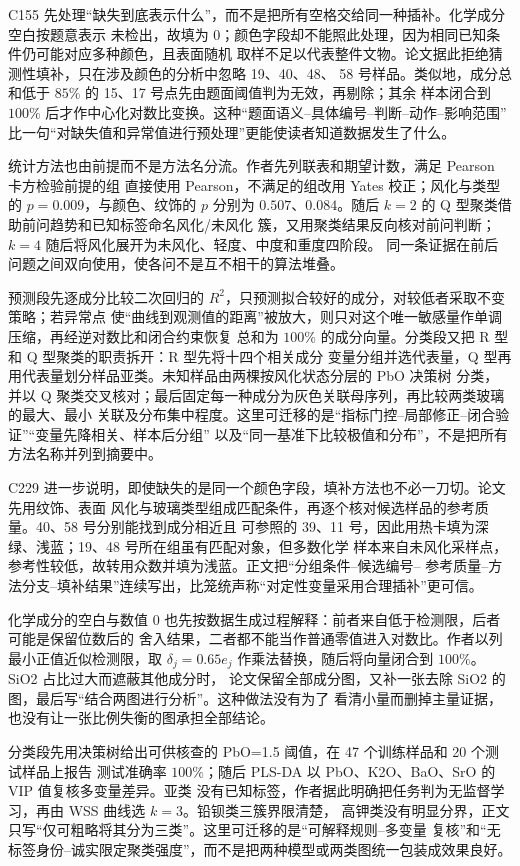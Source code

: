 C155 先处理“缺失到底表示什么”，而不是把所有空格交给同一种插补。化学成分空白按题意表示
未检出，故填为 0；颜色字段却不能照此处理，因为相同已知条件仍可能对应多种颜色，且表面随机
取样不足以代表整件文物。论文据此拒绝猜测性填补，只在涉及颜色的分析中忽略 19、40、48、
58 号样品。类似地，成分总和低于 $85\%$ 的 15、17 号点先由题面阈值判为无效，再剔除；其余
样本闭合到 $100\%$ 后才作中心化对数比变换。这种“题面语义--具体编号--判断--动作--影响范围”
比一句“对缺失值和异常值进行预处理”更能使读者知道数据发生了什么。

统计方法也由前提而不是方法名分流。作者先列联表和期望计数，满足 Pearson 卡方检验前提的组
直接使用 Pearson，不满足的组改用 Yates 校正；风化与类型的 $p=0.009$，与颜色、纹饰的
$p$ 分别为 $0.507$、$0.084$。随后 $k=2$ 的 Q 型聚类借助前问趋势和已知标签命名风化/未风化
簇，又用聚类结果反向核对前问判断；$k=4$ 随后将风化展开为未风化、轻度、中度和重度四阶段。
同一条证据在前后问题之间双向使用，使各问不是互不相干的算法堆叠。

预测段先逐成分比较二次回归的 $R^2$，只预测拟合较好的成分，对较低者采取不变策略；若异常点
使“曲线到观测值的距离”被放大，则只对这个唯一敏感量作单调压缩，再经逆对数比和闭合约束恢复
总和为 $100\%$ 的成分向量。分类段又把 R 型和 Q 型聚类的职责拆开：R 型先将十四个相关成分
变量分组并选代表量，Q 型再用代表量划分样品亚类。未知样品由两棵按风化状态分层的 PbO 决策树
分类，并以 Q 聚类交叉核对；最后固定每一种成分为灰色关联母序列，再比较两类玻璃的最大、最小
关联及分布集中程度。这里可迁移的是“指标门控--局部修正--闭合验证”“变量先降相关、样本后分组”
以及“同一基准下比较极值和分布”，不是把所有方法名称并列到摘要中。

C229 进一步说明，即使缺失的是同一个颜色字段，填补方法也不必一刀切。论文先用纹饰、表面
风化与玻璃类型组成匹配条件，再逐个核对候选样品的参考质量。40、58 号分别能找到成分相近且
可参照的 39、11 号，因此用热卡填为深绿、浅蓝；19、48 号所在组虽有匹配对象，但多数化学
样本来自未风化采样点，参考性较低，故转用众数并填为浅蓝。正文把“分组条件--候选编号--
参考质量--方法分支--填补结果”连续写出，比笼统声称“对定性变量采用合理插补”更可信。

化学成分的空白与数值 0 也先按数据生成过程解释：前者来自低于检测限，后者可能是保留位数后的
舍入结果，二者都不能当作普通零值进入对数比。作者以列最小正值近似检测限，取
$\delta_j=0.65e_j$ 作乘法替换，随后将向量闭合到 $100\%$。SiO2 占比过大而遮蔽其他成分时，
论文保留全部成分图，又补一张去除 SiO2 的图，最后写“结合两图进行分析”。这种做法没有为了
看清小量而删掉主量证据，也没有让一张比例失衡的图承担全部结论。

分类段先用决策树给出可供核查的 PbO=1.5 阈值，在 47 个训练样品和 20 个测试样品上报告
测试准确率 $100\%$；随后 PLS-DA 以 PbO、K2O、BaO、SrO 的 VIP 值复核多变量差异。亚类
没有已知标签，作者据此明确把任务判为无监督学习，再由 WSS 曲线选 $k=3$。铅钡类三簇界限清楚，
高钾类没有明显分界，正文只写“仅可粗略将其分为三类”。这里可迁移的是“可解释规则--多变量
复核”和“无标签身份--诚实限定聚类强度”，而不是把两种模型或两类图统一包装成效果良好。


